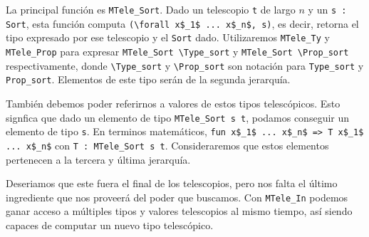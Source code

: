 La principal función es \lstinline{MTele_Sort}.
Dado un telescopio \lstinline{t} de largo $n$ y un \lstinline{s : Sort}, esta función computa \lstinline{(\forall x$_1$ ... x$_n$, s)}, es decir, retorna el tipo expresado por ese telescopio y el \lstinline{Sort} dado.
Utilizaremos \lstinline{MTele_Ty} y \lstinline{MTele_Prop} para expresar \lstinline{MTele_Sort \Type_sort} y \lstinline{MTele_Sort \Prop_sort} respectivamente, donde \lstinline{\Type_sort} y \lstinline{\Prop_sort} son notación para \lstinline{Type_sort} y \lstinline{Prop_sort}. Elementos de este tipo serán de la segunda jerarquía.

También debemos poder referirnos a valores de estos tipos telescópicos. Esto signfica que dado un elemento de tipo \lstinline{MTele_Sort s t}, podamos conseguir un elemento de tipo \lstinline{s}. En terminos matemáticos, \lstinline{fun x$_1$ ... x$_n$ => T x$_1$ ... x$_n$} con \lstinline{T : MTele_Sort s t}. Consideraremos que estos elementos pertenecen a la tercera y última jerarquía.

Deseriamos que este fuera el final de los telescopios, pero nos falta el último ingrediente que nos proveerá del poder que buscamos. Con \lstinline{MTele_In} podemos ganar acceso a múltiples tipos y valores telescopios al mismo tiempo, así siendo capaces de computar un nuevo tipo telescópico.
